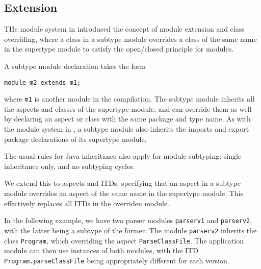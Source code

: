 \subsection{Extension}

THe module system in \cite{modulesastypes} introduced the concept of
module extension and class overriding, where a class in a subtype module
overrides a class of the same name in the supertype module to satisfy the 
open/closed principle for modules.

A subtype module declaration takes the form
\begin{lstlisting}
module m2 extends m1;
\end{lstlisting}
where \texttt{m1} is another module in the compilation. The subtype module
inherits all the aspects and classes of the supertype module, and can override
them as well by declaring an aspect or class with the same package and type name.
As with the module system in \cite{modulesastypes}, a subtype module also inherits
the imports and export package declarations of its supertype module.

The usual rules for Java inheritance also apply for module subtyping: single 
inheritance only, and no subtyping cycles.

We extend this to aspects and ITDs, specifying that an aspect in a subtype module
overrides an aspect of the same name in the supertype module. This effectively
replaces all ITDs in the overriden module.

In the following example, we have two parser modules \texttt{parserv1} and \texttt{parserv2},
with the latter being a subtype of the former. The module \texttt{parserv2} inherits
the class \texttt{Program}, which overriding the aspect \texttt{ParseClassFile}. The
application module can then use instances of both modules, with the ITD \texttt{Program.parseClassFile}
being appropriately different for each version.

